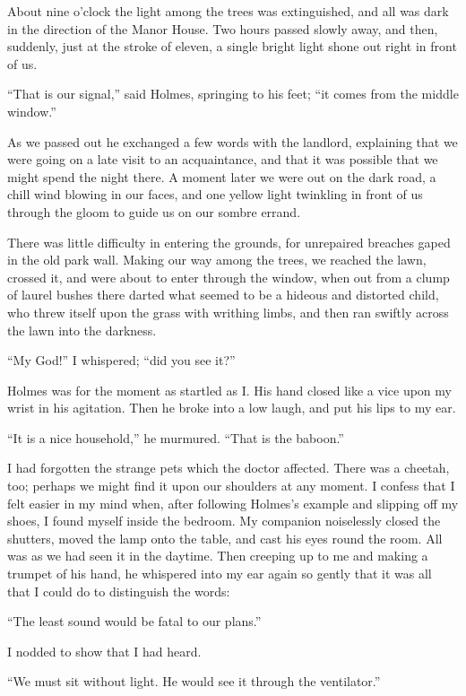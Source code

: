 \strut

About nine o’clock the light among the trees was extinguished,
and all was dark in the direction of the Manor
House. Two hours passed slowly away, and then, suddenly,
just at the stroke of eleven, a single bright light shone out
right in front of us.

“That is our signal,” said Holmes, springing to his feet;
“it comes from the middle window.”

As we passed out he exchanged a few words with the
landlord, explaining that we were going on a late visit to an
acquaintance, and that it was possible that we might spend the
night there. A moment later we were out on the dark road,
a chill wind blowing in our faces, and one yellow light twinkling
in front of us through the gloom to guide us on our sombre
errand.

There was little difficulty in entering the grounds, for unrepaired
breaches gaped in the old park wall. Making our way
among the trees, we reached the lawn, crossed it, and were
about to enter through the window, when out from a clump
of laurel bushes there darted what seemed to be a hideous
and distorted child, who threw itself upon the grass with
writhing limbs, and then ran swiftly across the lawn into the
darkness.

“My God!” I whispered; “did you see it?”

Holmes was for the moment as startled as I. His hand
closed like a vice upon my wrist in his agitation. Then he
broke into a low laugh, and put his lips to my ear.

“It is a nice household,” he murmured. “That is the
baboon.”

I had forgotten the strange pets which the doctor affected.
There was a cheetah, too; perhaps we might find it upon our
shoulders at any moment. I confess that I felt easier in my
mind when, after following Holmes’s example and slipping off
my shoes, I found myself inside the bedroom. My companion
noiselessly closed the shutters, moved the lamp onto the
table, and cast his eyes round the room. All was as we had
seen it in the daytime. Then creeping up to me and making
a trumpet of his hand, he whispered into my ear again so
gently that it was all that I could do to distinguish the words:

“The least sound would be fatal to our plans.”

I nodded to show that I had heard.

“We must sit without light. He would see it through the
ventilator.”

